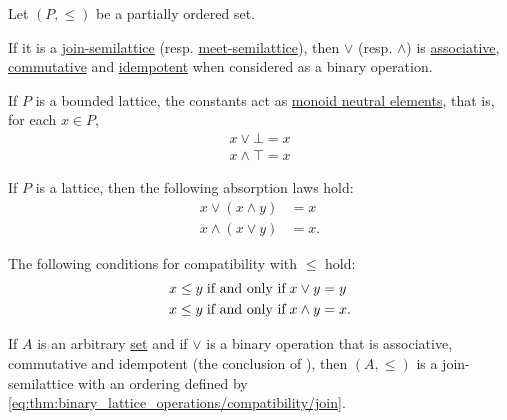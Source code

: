\begin{proposition}\label{thm:binary_lattice_operations}
  Let \( (P, \leq) \) be a partially ordered set.

  \begin{thmenum}
     If it is a \hyperref[def:semilattice/join]{join-semilattice} (resp. \hyperref[def:semilattice/meet]{meet-semilattice}), then \( \vee \) (resp. \( \wedge \)) is \hyperref[def:binary_operation/associative]{associative}, \hyperref[def:binary_operation/commutative]{commutative} and \hyperref[def:binary_operation/idempotent]{idempotent} when considered as a binary operation.

     If \( P \) is a bounded lattice, the constants act as \hyperref[def:monoid]{monoid neutral elements}, that is, for each \( x \in P \),
    \begin{align}
      x \vee \bot = x \label{eq:thm:binary_lattice_operations/neutral/join} \\
      x \wedge \top = x \label{eq:thm:binary_lattice_operations/neutral/meet}
    \end{align}

     If \( P \) is a lattice, then the following absorption laws hold:
    \begin{align}
      x \vee (x \wedge y) &= x \label{eq:thm:binary_lattice_operations/absorption/join} \\
      x \wedge (x \vee y) &= x \label{eq:thm:binary_lattice_operations/absorption/meet}.
    \end{align}

     The following conditions for compatibility with \( \leq \) hold:
    \begin{align}
      x \leq y &\T{if and only if} x \vee y = y \label{eq:thm:binary_lattice_operations/compatibility/join} \\
      x \leq y &\T{if and only if} x \wedge y = x \label{eq:thm:binary_lattice_operations/compatibility/meet}.
    \end{align}

     If \( A \) is an arbitrary \hyperref[def:set]{set} and if \( \vee \) is a binary operation that is associative, commutative and idempotent (the conclusion of ), then \( (A, \leq) \) is a join-semilattice with an ordering defined by \eqref{eq:thm:binary_lattice_operations/compatibility/join}.


\end{thmenum}
\end{proposition}
